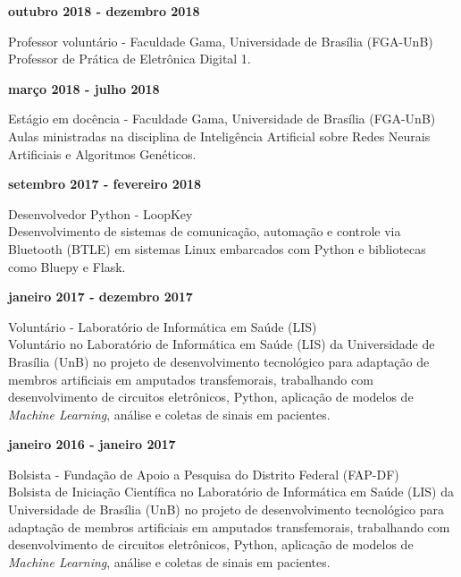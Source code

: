 \documentclass[11pt]{article}
\begin{document}
\textbf{outubro 2018 - dezembro 2018}
\begin{addmargin}{0.5cm}
Professor voluntário - Faculdade Gama, Universidade de Brasília (FGA-UnB)\\
Professor de Prática de Eletrônica Digital 1. \\
\end{addmargin}

\textbf{março 2018 - julho 2018}
\begin{addmargin}{0.5cm}
Estágio em docência - Faculdade Gama, Universidade de Brasília (FGA-UnB)\\
Aulas ministradas na disciplina de Inteligência Artificial sobre Redes 
Neurais Artificiais e Algoritmos Genéticos. \\
\end{addmargin}

\textbf{setembro 2017 - fevereiro 2018}
\begin{addmargin}{0.5cm}
Desenvolvedor Python - LoopKey\\
Desenvolvimento de sistemas de comunicação, automação e controle via Bluetooth
(BTLE) em sistemas Linux embarcados com Python e bibliotecas como
Bluepy e Flask. \\
\end{addmargin}

\newpage
\textbf{janeiro 2017 - dezembro 2017}
\begin{addmargin}{0.5cm}
Voluntário - Laboratório de Informática em Saúde (LIS)\\
Voluntário no Laboratório de Informática em Saúde (LIS) da Universidade de
Brasília (UnB) no projeto
de desenvolvimento tecnológico para adaptação de membros artificiais em amputados transfemorais,
trabalhando com desenvolvimento de circuitos eletrônicos, Python, aplicação de modelos de 
\textit{Machine Learning}, análise e coletas de sinais em pacientes.\\
\end{addmargin}

\textbf{janeiro 2016 - janeiro 2017}
\begin{addmargin}{0.5cm}
Bolsista - Fundação de Apoio a Pesquisa do Distrito Federal (FAP-DF)\\
Bolsista de Iniciação Científica no Laboratório de Informática em Saúde (LIS)  da Universidade de
Brasília (UnB) no projeto
de desenvolvimento tecnológico para adaptação de membros artificiais em amputados transfemorais,
trabalhando com desenvolvimento de circuitos eletrônicos, Python, aplicação de modelos de 
\textit{Machine Learning}, análise e coletas de sinais em pacientes.\\
\end{addmargin}
\end{document}
